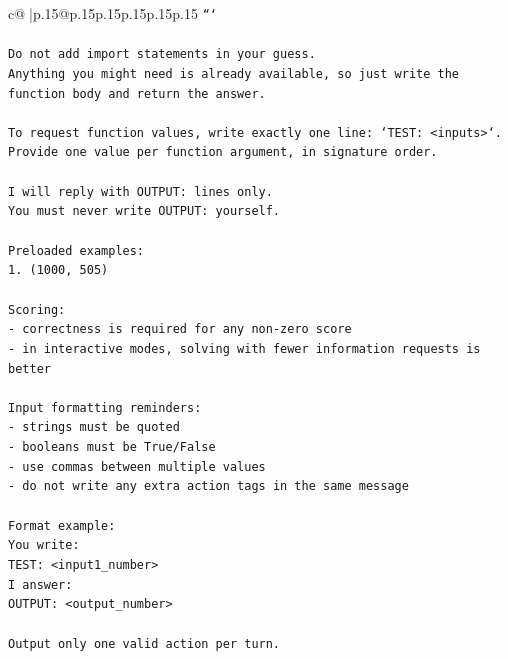 \documentclass{article}
\begin{document}
{\begin{supertabular}{c@{$\;$}|p{.15\linewidth}@{}p{.15\linewidth}p{.15\linewidth}p{.15\linewidth}p{.15\linewidth}p{.15\linewidth}}
{{{\texttt{```} \\
\\ 
\texttt{Do not add import statements in your guess.} \\
\texttt{Anything you might need is already available, so just write the function body and return the answer.} \\
\\ 
\texttt{To request function values, write exactly one line: `TEST: <inputs>`.} \\
\texttt{Provide one value per function argument, in signature order.} \\
\\ 
\texttt{I will reply with OUTPUT: lines only.} \\
\texttt{You must never write OUTPUT: yourself.} \\
\\ 
\texttt{Preloaded examples:} \\
\texttt{1. (1000, 505)} \\
\\ 
\texttt{Scoring:} \\
\texttt{{-} correctness is required for any non{-}zero score} \\
\texttt{{-} in interactive modes, solving with fewer information requests is better} \\
\\ 
\texttt{Input formatting reminders:} \\
\texttt{{-} strings must be quoted} \\
\texttt{{-} booleans must be True/False} \\
\texttt{{-} use commas between multiple values} \\
\texttt{{-} do not write any extra action tags in the same message} \\
\\ 
\texttt{Format example:} \\
\texttt{You write:} \\
\texttt{TEST: <input1\_number>} \\
\texttt{I answer:} \\
\texttt{OUTPUT: <output\_number>} \\
\\ 
\texttt{Output only one valid action per turn.} \\
            }
        }
    }
     \\ \\


\end{supertabular}}
\end{document}
